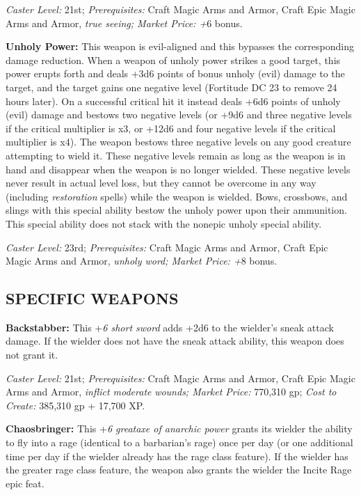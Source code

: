 \documentclass{article}
\begin{document}
\textit{Caster Level: }21st; \textit{Prerequisites: }Craft Magic Arms and Armor, 
Craft Epic Magic Arms and Armor, \textit{true seeing; Market Price: +}6 bonus. 

\textbf{Unholy Power: }This weapon is evil-aligned and this bypasses the corresponding 
damage reduction. When a weapon of unholy power strikes a good target, this power 
erupts forth and deals +3d6 points of bonus unholy (evil) damage to the target, 
and the target gains one negative level (Fortitude DC 23 to remove 24 hours later). 
On a successful critical hit it instead deals +6d6 points of unholy (evil) damage 
and bestows two negative levels (or +9d6 and three negative levels if the critical 
multiplier is x3, or +12d6 and four negative levels if the critical multiplier 
is x4). The weapon bestows three negative levels on any good creature attempting 
to wield it. These negative levels remain as long as the weapon is in hand and 
disappear when the weapon is no longer wielded. These negative levels never result 
in actual level loss, but they cannot be overcome in any way (including \textit{restoration 
}spells) while the weapon is wielded. Bows, crossbows, and slings with this special 
ability bestow the unholy power upon their ammunition. This special ability does 
not stack with the nonepic unholy special ability.\textit{ }

\textit{Caster Level: }23rd; \textit{Prerequisites: }Craft Magic Arms and Armor, 
Craft Epic Magic Arms and Armor, \textit{unholy word; Market Price: +}8 bonus. 

\vspace{12pt}
\subsection*{SPECIFIC WEAPONS}

\vspace{12pt}
\textbf{Backstabber: }This +\textit{6 short sword }adds +2d6 to the wielder's sneak 
attack damage. If the wielder does not have the sneak attack ability, this weapon 
does not grant it. 

\textit{Caster Level: }21st; \textit{Prerequisites: }Craft Magic Arms and Armor, 
Craft Epic Magic Arms and Armor, \textit{inflict moderate} \textit{wounds; Market 
Price: }770,310 gp; \textit{Cost to Create: }385,310 gp + 17,700 XP. 

\textbf{Chaosbringer: }This +\textit{6 greataxe of anarchic power }grants its wielder 
the ability to fly into a rage (identical to a barbarian's rage) once per day (or 
one additional time per day if the wielder already has the rage class feature). 
If the wielder has the greater rage class feature, the weapon also grants the wielder 
the Incite Rage epic feat. 
\end{document}
